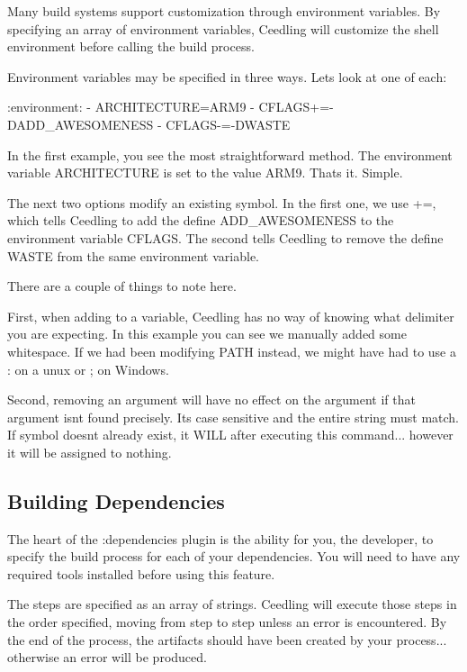 Many build systems support customization through environment variables. By specifying an array of environment variables, Ceedling will customize the shell environment before calling the build process.

Environment variables may be specified in three ways. Let\textquotesingle{}s look at one of each\+:


\begin{DoxyCode}
:environment:
  - ARCHITECTURE=ARM9
  - CFLAGS+=-DADD\_AWESOMENESS
  - CFLAGS-=-DWASTE
\end{DoxyCode}


In the first example, you see the most straightforward method. The environment variable {\ttfamily A\+R\+C\+H\+I\+T\+E\+C\+T\+U\+RE} is set to the value {\ttfamily A\+R\+M9}. That\textquotesingle{}s it. Simple.

The next two options modify an existing symbol. In the first one, we use {\ttfamily +=}, which tells Ceedling to add the define {\ttfamily A\+D\+D\+\_\+\+A\+W\+E\+S\+O\+M\+E\+N\+E\+SS} to the environment variable {\ttfamily C\+F\+L\+A\+GS}. The second tells Ceedling to remove the define {\ttfamily W\+A\+S\+TE} from the same environment variable.

There are a couple of things to note here.

First, when adding to a variable, Ceedling has no way of knowing what delimiter you are expecting. In this example you can see we manually added some whitespace. If we had been modifying {\ttfamily P\+A\+TH} instead, we might have had to use a {\ttfamily \+:} on a unux or {\ttfamily ;} on Windows.

Second, removing an argument will have no effect on the argument if that argument isn\textquotesingle{}t found precisely. It\textquotesingle{}s case sensitive and the entire string must match. If symbol doesn\textquotesingle{}t already exist, it W\+I\+LL after executing this command... however it will be assigned to nothing.

\subsection*{Building Dependencies }

The heart of the {\ttfamily \+:dependencies} plugin is the ability for you, the developer, to specify the build process for each of your dependencies. You will need to have any required tools installed before using this feature.

The steps are specified as an array of strings. Ceedling will execute those steps in the order specified, moving from step to step unless an error is encountered. By the end of the process, the artifacts should have been created by your process... otherwise an error will be produced.

